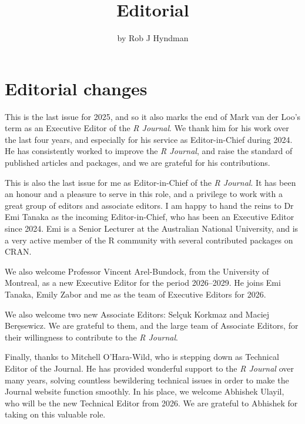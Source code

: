 \title{Editorial}


\author{by Rob J Hyndman}

\maketitle


\section*{Editorial changes}\label{editorial-changes}

This is the last issue for 2025, and so it also marks the end of Mark van der Loo's term as an Executive Editor of the \emph{R Journal}. We thank him for his work over the last four years, and especially for his service as Editor-in-Chief during 2024. He has consistently worked to improve the \emph{R Journal}, and raise the standard of published articles and packages, and we are grateful for his contributions.

This is also the last issue for me as Editor-in-Chief of the \emph{R Journal}. It has been an honour and a pleasure to serve in this role, and a privilege to work with a great group of editors and associate editors. I am happy to hand the reins to Dr Emi Tanaka as the incoming Editor-in-Chief, who has been an Executive Editor since 2024. Emi is a Senior Lecturer at the Australian National University, and is a very active member of the R community with several contributed packages on CRAN.

We also welcome Professor Vincent Arel-Bundock, from the University of Montreal, as a new Executive Editor for the period 2026--2029. He joins Emi Tanaka, Emily Zabor and me as the team of Executive Editors for 2026.

We also welcome two new Associate Editors: Selçuk Korkmaz and Maciej Beręsewicz. We are grateful to them, and the large team of Associate Editors, for their willingness to contribute to the \emph{R Journal}.

Finally, thanks to Mitchell O'Hara-Wild, who is stepping down as Technical Editor of the Journal. He has provided wonderful support to the \emph{R Journal} over many years, solving countless bewildering technical issues in order to make the Journal website function smoothly. In his place, we welcome Abhishek Ulayil, who will be the new Technical Editor from 2026. We are grateful to Abhishek for taking on this valuable role.

